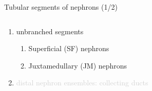\documentclass[serif]{beamer}
\begin{document}
\begin{frame}{Tubular segments of nephrons (1/2)}
    \begin{columns}
        \begin{column}{0.5\linewidth}
            \begin{enumerate}
                \item unbranched segments
                \begin{enumerate}
                    \item Superficial (SF) nephrons
                    \item Juxtamedullary (JM) nephrons
                \end{enumerate}
                \item \textcolor<2->{lightgray}{distal nephron ensembles: collecting ducts}
            \end{enumerate}
        \end{column}\hfill
        \begin{column}{0.5\linewidth}
\end{column}
\end{columns}
\end{frame}
\end{document}
